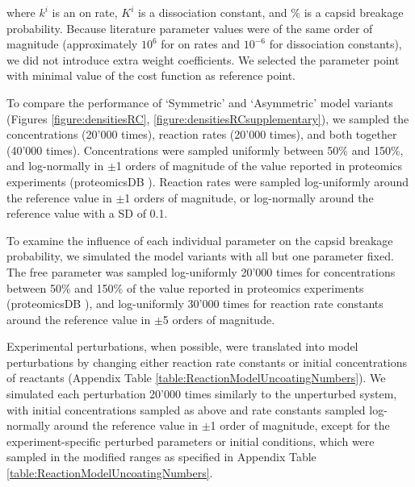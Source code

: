 where $k^i$ is an on rate, $K^i$ is a dissociation constant, and $\%$ is a capsid breakage probability. Because literature parameter values were of the same order of magnitude (approximately $10^6$ for on rates and $10^{-6}$ for dissociation constants), we did not introduce extra weight coefficients. We selected the parameter point with minimal value of the cost function as reference point.

To compare the performance of ‘Symmetric’ and ‘Asymmetric’ model variants (Figures \ref{figure:densitiesRC}, \ref{figure:densitiesRCsupplementary}), we sampled the concentrations (20’000 times), reaction rates (20’000 times), and both together (40’000 times). Concentrations were sampled uniformly between 50\% and 150\%, and log-normally in $\pm$1 orders of magnitude of the value reported in proteomics experiments (proteomicsDB \cite{schmidt2018proteomicsdb}). Reaction rates were sampled log-uniformly around the reference value in $\pm$1 orders of magnitude, or log-normally around the reference value with a SD of 0.1.

To examine the influence of each individual parameter on the capsid breakage probability, we simulated the model variants with all but one parameter fixed. The free parameter was sampled log-uniformly 20’000 times for concentrations between 50\% and 150\% of the value reported in proteomics experiments (proteomicsDB \cite{schmidt2018proteomicsdb}), and log-uniformly 30’000 times for reaction rate constants around the reference value in $\pm$5 orders of magnitude.

Experimental perturbations, when possible, were translated into model perturbations by changing either reaction rate constants or initial concentrations of reactants (Appendix Table \ref{table:ReactionModelUncoatingNumbers}). We simulated each perturbation 20’000 times similarly to the unperturbed system, with initial concentrations sampled as above and rate constants sampled log-normally around the reference value in $\pm$1 order of magnitude, except for the experiment-specific perturbed parameters or initial conditions, which were sampled in the modified ranges as specified in Appendix Table \ref{table:ReactionModelUncoatingNumbers}.

